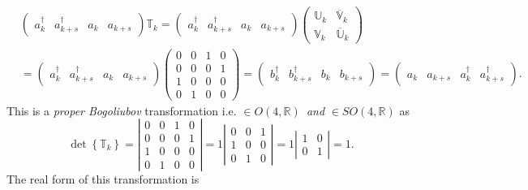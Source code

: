 \documentclass[aps, preprint]{revtex4}
\begin{document}
\begin{align} & \left (\begin{array}{cccc}a_{k}^{ \dag } & a_{k +s}^{ \dag } & a_{k} & a_{k +s}\end{array}\right ) \mathbb{T}_{k} =\left (\begin{array}{cccc}a_{k}^{ \dag } & a_{k +s}^{ \dag } & a_{k} & a_{k +s}\end{array}\right ) \left (\begin{array}{cc}\mathbb{U}_{k} & \overline{\mathbb{V}}_{k} \\
\mathbb{V}_{k} & \overline{\mathbb{U}}_{k}\end{array}\right ) \nonumber  \\
 &  =\left (\begin{array}{cccc}a_{k}^{ \dag } & a_{k +s}^{ \dag } & a_{k} & a_{k +s}\end{array}\right ) \left (\begin{array}{cccc}0 & 0 & 1 & 0 \\
0 & 0 & 0 & 1 \\
1 & 0 & 0 & 0 \\
0 & 1 & 0 & 0\end{array}\right ) =\left (\begin{array}{cccc}b_{k}^{ \dag } & b_{k +s}^{ \dag } & b_{k} & b_{k +s}\end{array}\right ) =\left (\begin{array}{cccc}a_{k} & a_{k +s} & a_{k}^{ \dag } & a_{k +s}^{ \dag }\end{array}\right )\text{.}\end{align}This is a \emph{proper Bogoliubov} transformation i.e. $ \in O \left (4 ,\mathbb{R}\right )$\emph{\ and} $ \in S O \left (4 ,\mathbb{R}\right )$ as
\begin{equation}\det \left \{\mathbb{T}_{k}\right \} =\left \vert \begin{array}{cccc}0 & 0 & 1 & 0 \\
0 & 0 & 0 & 1 \\
1 & 0 & 0 & 0 \\
0 & 1 & 0 & 0\end{array}\right \vert  =1 \left \vert \begin{array}{ccc}0 & 0 & 1 \\
1 & 0 & 0 \\
0 & 1 & 0\end{array}\right \vert  =1 \left \vert \begin{array}{cc}1 & 0 \\
0 & 1\end{array}\right \vert  =1.
\end{equation}The real form of this transformation is
\end{document}
